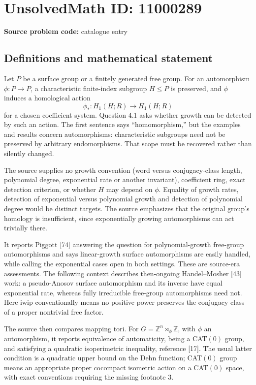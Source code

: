 \documentclass[11pt]{article}
\newcommand{\Z}{\mathbb{Z}}
\begin{document}
\section*{UnsolvedMath ID: 11000289}
\textbf{Source problem code:} catalogue entry
\subsection{Definitions and mathematical statement}
Let \(P\) be a surface group or a finitely generated free group. For an automorphism \(\phi:P\to P\), a characteristic finite-index subgroup \(H\le P\) is preserved, and \(\phi\) induces a homological action
\[
 \phi_*:H_1(H;R)\longrightarrow H_1(H;R)
\]
for a chosen coefficient system. Question 4.1 asks whether growth can be detected by such an action. The first sentence says ``homomorphism,'' but the examples and results concern automorphisms: characteristic subgroups need not be preserved by arbitrary endomorphisms. That scope must be recovered rather than silently changed.

The source supplies no growth convention (word versus conjugacy-class length, polynomial degree, exponential rate or another invariant), coefficient ring, exact detection criterion, or whether \(H\) may depend on \(\phi\). Equality of growth rates, detection of exponential versus polynomial growth and detection of polynomial degree would be distinct targets. The source emphasizes that the original group's homology is insufficient, since exponentially growing automorphisms can act trivially there.

It reports Piggott [74] answering the question for polynomial-growth free-group automorphisms and says linear-growth surface automorphisms are easily handled, while calling the exponential cases open in both settings. These are source-era assessments. The following context describes then-ongoing Handel--Mosher [43] work: a pseudo-Anosov surface automorphism and its inverse have equal exponential rate, whereas fully irreducible free-group automorphisms need not. Here iwip conventionally means no positive power preserves the conjugacy class of a proper nontrivial free factor.

The source then compares mapping tori. For \(G=\Z^n\rtimes_\phi\Z\), with \(\phi\) an automorphism, it reports equivalence of automaticity, being a CAT\((0)\) group, and satisfying a quadratic isoperimetric inequality, reference [17]. The usual latter condition is a quadratic upper bound on the Dehn function; CAT\((0)\) group means an appropriate proper cocompact isometric action on a CAT\((0)\) space, with exact conventions requiring the missing footnote 3.
\end{document}
